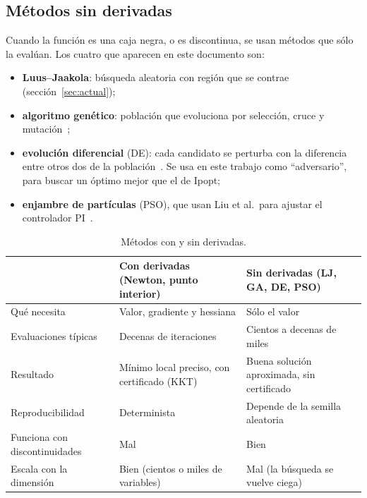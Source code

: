 \subsection{Métodos sin derivadas}
Cuando la función es una caja negra, o es discontinua, se usan métodos que sólo la evalúan.
Los cuatro que aparecen en este documento son:
\begin{itemize}
  \item \textbf{Luus--Jaakola}: búsqueda aleatoria con región que se contrae~\cite{luus1973}
        (sección~\ref{sec:actual});
  \item \textbf{algoritmo genético}: población que evoluciona por selección, cruce y
        mutación~\cite{goldberg1989};
  \item \textbf{evolución diferencial} (DE): cada candidato se perturba con la diferencia
        entre otros dos de la población~\cite{storn1997}. Se usa en este trabajo como
        ``adversario'', para buscar un óptimo mejor que el de Ipopt;
  \item \textbf{enjambre de partículas} (PSO), que usan Liu et al.\ para ajustar el controlador
        PI~\cite{kennedy1995,liu2021}.
\end{itemize}

\begin{table}[H]\centering\small
\begin{tabularx}{\linewidth}{@{}l Y Y@{}}\toprule
& Con derivadas (Newton, punto interior) & Sin derivadas (LJ, GA, DE, PSO)\\\midrule
Qué necesita & Valor, gradiente y hessiana & Sólo el valor\\
Evaluaciones típicas & Decenas de iteraciones & Cientos a decenas de miles\\
Resultado & Mínimo local preciso, con certificado (KKT) & Buena solución aproximada, sin certificado\\
Reproducibilidad & Determinista & Depende de la semilla aleatoria\\
Funciona con discontinuidades & Mal & Bien\\
Escala con la dimensión & Bien (cientos o miles de variables) & Mal (la búsqueda se vuelve ciega)\\\bottomrule
\end{tabularx}
\caption{Métodos con y sin derivadas.}
\end{table}

